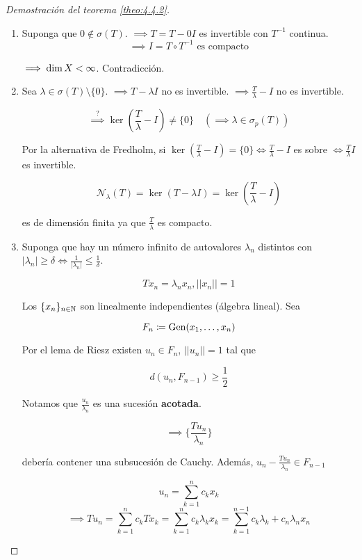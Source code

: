 \begin{proof}[Demostración del teorema \ref{theo:4.4.2}]\hfill
   \begin{enumerate}[label=\alph*)]
      \item Suponga que $0\notin\sigma(T)$. $\implies T=T-0I$ es invertible con $T^{-1}$ continua.
      \[\implies I=T\circ T^{-1}\text{ es compacto}\]

      $\implies \operatorname{dim} X<\infty$. Contradicción.

      \item Sea $\lambda\in\sigma(T)\setminus\{0\}$. $\implies T-\lambda I$ no es invertible. $\implies \frac{T}{\lambda}-I$ no es invertible.
      
      \[\overset{?}{\implies} \ker \left(\frac{T}{\lambda}-I\right)\neq\{0\}\quad(\implies \lambda\in\sigma_p(T))\]

      Por la alternativa de Fredholm, si $\ker\left(\frac{T}{\lambda}-I\right)=\{0\}\iff \frac{T}{\lambda}-I$ es sobre $\iff \frac{T}{\lambda}I$ es invertible.

      \[\mathcal{N}_\lambda(T)=\ker(T-\lambda I)=\ker\left(\frac{T}{\lambda}-I\right)\]

      es de dimensión finita ya que $\frac{T}{\lambda}$ es compacto.

      \item Suponga que hay un número infinito de autovalores $\lambda_n$ distintos con $|\lambda_n|\geq\delta\iff \frac{1}{|\lambda_n|}\leq \frac{1}{\delta}$.
      
      \[Tx_n=\lambda_n x_n,||x_n||=1\]

      Los $\{x_n\}_{n\in\mathbb{N}}$ son linealmente independientes (álgebra lineal). Sea

      \[F_n\coloneqq \operatorname{Gen}(x_1,\ldots,x_n)\]

      Por el lema de Riesz existen $u_n\in F_n$, $||u_n||=1$ tal que 

      \[d(u_n,F_{n-1})\geq \frac{1}{2}\]

      Notamos que $\frac{u_n}{\lambda_n}$ es una sucesión \textbf{acotada}.

      \[\implies \{\frac{T u_n}{\lambda_n}\}\]

      debería contener una subsucesión de Cauchy. Además, $u_n-\frac{Tu_n}{\lambda_n}\in F_{n-1}$ 

      \[u_n=\sum_{k=1}^n c_k x_k\]
      \[\implies T u_n=\sum_{k=1}^n c_k T x_k=\sum_{k=1}^n c_k\lambda_kx_k=\sum_{k=1}^{n-1}c_k\lambda_k+c_n\lambda_nx_n\]


\end{enumerate}
\end{proof}

